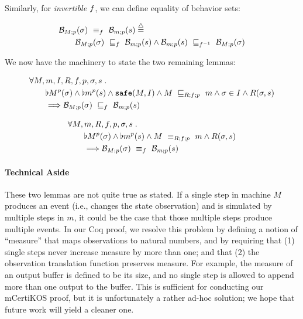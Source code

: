 \noindent
Similarly, for \emph{invertible} $\obsrel{R}$, we can define equality
of behavior sets:

\begin{definition}
\label{beh-equality}
{\small
\begin{align*}
& \bisimu{\behavior{M;p}{\sigma}}{\behavior{m;p}{s}}{\obsrel{R}}
\isdef \\
& \qquad \simu{\behavior{M;p}{\sigma}}{\behavior{m;p}{s}}{\obsrel{R}}
\land \simu{\behavior{m;p}{s}}{\behavior{M;p}{\sigma}}{\obsrel{R}^{-1}}
\end{align*}}
\end{definition}

\noindent
We now have the machinery to state the two remaining
lemmas:

\begin{lem}
\label{beh-sim-subset}
{\small
\begin{align*}
& \forall M, m, I, R, 
\obsrel{R},
p, \sigma, s \such \\
& \qquad
\behaviorals{M}{p}{\sigma} \land \behaviorals{m}{p}{s} 
\land \safe{M}{I} \land 
\simu{M}{m}{R;\obsrel{R};p}
\land \sigma \in I \land R(\sigma,s) \\
& \qquad \Longrightarrow 
\simu{\behavior{M;p}{\sigma}}{\behavior{m;p}{s}}{\obsrel{R}}
\end{align*}}
\end{lem}

\begin{lem}
\label{beh-bisim}
{\small
\begin{align*}
& \forall M, m, R, 
\obsrel{R},
p, \sigma, s \such \\
& \qquad
\behaviorals{M}{p}{\sigma} \land \behaviorals{m}{p}{s} 
\land 
\bisimu{M}{m}{R;\obsrel{R};p} \land R(\sigma,s) \\
& \qquad \Longrightarrow 
\bisimu{\behavior{M;p}{\sigma}}{\behavior{m;p}{s}}{\obsrel{R}}
\end{align*}}
\end{lem}

\paragraph{Technical Aside}
These two lemmas are not quite true as stated. If
a single step in machine $M$ produces an event (i.e., changes
the state observation) and is simulated by multiple steps in
$m$, it could be the case that those multiple steps produce
multiple events. In our Coq proof, we resolve this problem by
defining a notion of ``measure'' that maps observations to
natural numbers, and by requiring that (1) single steps never increase
measure by more than one; and that (2) the observation translation function
preserves measure.
For example, the measure of an output buffer is defined to be its size,
and no single step is allowed to append more than one output to the buffer.
This is sufficient for conducting our mCertiKOS proof, but it is unfortunately a 
rather ad-hoc solution; we hope that future work will yield a cleaner one.

